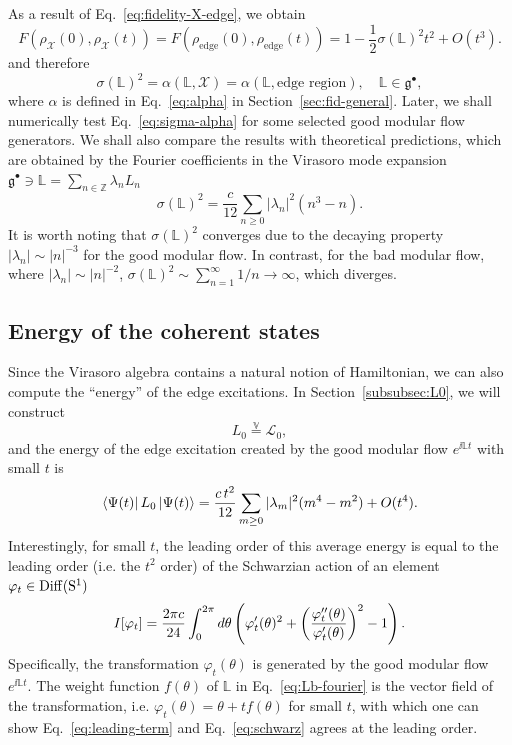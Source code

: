 \documentclass[12pt, nofootinbib]{article}
\theoremstyle{plain}
\theoremstyle{assumption}
\theoremstyle{definition}
\theoremstyle{plain}
\theoremstyle{plain}
\theoremstyle{plain}
\theoremstyle{plain}
\theoremstyle{plain}
\def\veq{\stackrel{\mathbb{V}}{=}}
\def\Lb{\mathbb{L}}
\def\Lcft{\mathscr{L}}
\def\({\left(}
\def\){\right)}
\def\gc{\mathfrak{g}^{\bullet}}
\begin{document}
As a result of Eq.~\eqref{eq:fidelity-X-edge}, we obtain 
\begin{equation}
    F(\rho_{\mathcal{X}}(0),\rho_{\mathcal{X}}(t)) = F(\rho_{\text{edge}}(0), \rho_{\text{edge}}(t)) = 1 - \frac{1}{2} \sigma(\Lb)^2 t^2 + O(t^3). 
\end{equation}
and therefore 
\begin{equation}\label{eq:sigma-alpha}
   \boxed{ \sigma(\Lb)^2 = \alpha(\Lb,\mathcal{X}) = \alpha(\Lb,\text{edge region}),\quad \Lb\in\gc}, 
\end{equation}
where $\alpha$ is defined in Eq.~\eqref{eq:alpha} in Section~\ref{sec:fid-general}. Later, we shall numerically test Eq.~\eqref{eq:sigma-alpha} for some selected good modular flow generators. We shall also compare the results with theoretical predictions, which are obtained by the Fourier coefficients in the Virasoro mode expansion $\gc\ni \Lb = \sum_{n\in\mathbb{Z}} \lambda_n L_n$ 
\begin{equation}\label{eq:sigma-Lb}
    \sigma(\Lb)^2 = \frac{c}{12}\sum_{n\geq 0} |\lambda_n|^2 (n^3-n). 
\end{equation}
It is worth noting that $\sigma(\Lb)^2$ converges due to the decaying property $|\lambda_n|\sim |n|^{-3}$ for the good modular flow.
In contrast, for the bad modular flow, where $|\lambda_n|\sim |n|^{-2}$, $\sigma(\Lb)^2 \sim \sum_{n=1}^{\infty} 1/n \to \infty$, which diverges.

\subsection{Energy of the coherent states}
\label{subsec:schwarzian}

 
Since the Virasoro algebra contains a natural notion of Hamiltonian, 
we can also compute the ``energy'' of the edge excitations. In Section~\ref{subsubsec:L0}, we will construct  
\begin{equation}
    L_0 \veq \Lcft_0,
\end{equation}
and the energy of the edge excitation created by the good modular flow $e^{\ii \Lb t}$ with small $t$ is 
\begin{equation}\label{eq:leading-term}
    \left\langle\Psi(t)\right|L_0 \left|\Psi(t)\right\rangle = {c \,  t^2 \over 12} \sum_{m\geq 0} |\lambda_m|^2 (m^4-m^2) + O(t^4).  
\end{equation}
Interestingly, for small $t$, the leading order of this average energy is equal to the leading order (i.e. the $t^2$ order) of the Schwarzian action of an element $\varphi_t \in \rm{Diff}(S^1)$
\begin{equation}\label{eq:schwarz}
    I[\varphi_t] = {2\pi c\over 24 }  \int_0^{2\pi} d\theta 
\( \varphi'_t(\theta)^2 + \( { \varphi''_t(\theta) \over \varphi'_t(\theta)} \)^2 - 1 \) .
\end{equation}
Specifically, the transformation $\varphi_t(\theta)$ is generated by the good modular flow $e^{\ii \Lb t}$. The weight function $f(\theta)$ of $\Lb$ in Eq.~\eqref{eq:Lb-fourier} is the vector field of the transformation, i.e. $\varphi_t(\theta) = \theta + t f(\theta)$ for small $t$, with which one can show Eq.~\eqref{eq:leading-term} and Eq.~\eqref{eq:schwarz} agrees at the leading order.  
\end{document}
